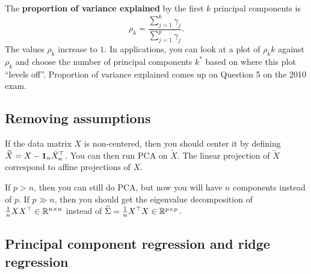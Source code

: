 The \textbf{proportion of variance explained} by the first $k$ principal components is 
\[\rho_k = \frac{\sum_{j=1}^k \gamma_j}{\sum_{j=1}^p \gamma_j}. \]
The values $\rho_k$ increase to $1$. In applications, you can look at a plot of $\rho_kk$ against $\rho_k$ and choose the number of principal components $k^*$ based on where this plot ``levels off''. Proportion of variance explained comes up on Question 5 on the 2010 exam.

\subsection{Removing assumptions}

If the data matrix $X$ is non-centered, then you should center it by defining $\widetilde{X}=X- \mathbf 1_n \bar{X}_n^\top$. You can then run PCA on $\widetilde{X}$. The linear projection of $\widetilde{X}$ correspond to affine projections of $X$. 

If $p > n$, then you can still do PCA, but now you will have $n$ components instead of $p$. If $p \gg n$, then you should get the eigenvalue decomposition of $\frac{1}{n}XX^\top \in \mathbb{R}^{n \times n}$ instead of $\widehat{\Sigma} = \frac{1}{n}X^\top X \in \mathbb{R}^{p \times p}$. 

\subsection{Principal component regression and ridge regression}

